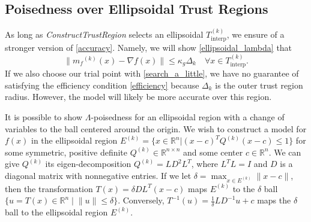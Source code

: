 \documentclass{article}
\theoremstyle{case}
\newcommand{\modelk}{{{m}_f}^{(k)}}
\newcommand{\sampletrk}{{T_{\text{interp}}^{(k)}}}
\newcommand{\ellipsek}{{E^{(k)}}}
\newcommand{\qk}{{Q^{(k)}}}
\begin{document}
\subsection{Poisedness over Ellipsoidal Trust Regions}

As long as \emph{ConstructTrustRegion} selects an ellipsoidal $ \sampletrk $, we ensure of a stronger version of \cref{accuracy}.
Namely, we will show \cref{ellipsoidal_lambda} that 
\[
    \|\modelk(x) - \nabla f(x) \| \le \kappa_g \Delta_{k} \quad \forall x \in \sampletrk.
\]
If we also choose our trial point with \cref{search_a_little}, we have no guarantee of satisfying the efficiency condition \cref{efficiency} because $\Delta_k$ is the outer trust region radius.
However, the model will likely be more accurate over this region.

It is possible to show $\Lambda$-poisedness for an ellipsoidal region with a change of variables to the ball centered around the origin.
We wish to construct a model for $f(x)$ in the ellipsoidal region
$\ellipsek = \{x \in \mathbb R^n | (x - c)^T\qk(x - c) \le 1\}$ for some symmetric, positive definite
$\qk \in \mathbb R^{n\times n}$ and some center $c \in \mathbb R^n$.
We can give $\qk$ its eigen-decomposition $\qk = L D^2 L^T$, where $L^TL = I$ and $D$ is a diagonal matrix with nonnegative entries.
If we let $\delta = \max_{x\in \ellipsek}\|x-c\|$, then the transformation $T(x) = \delta DL^T(x - c)$ maps $ \ellipsek $ to the $\delta$ ball $\{u = T(x) \in \mathbb R^n \; | \; \|u\| \le \delta\}$.
Conversely, $ T^{-1}(u) = \frac 1 {\delta} LD^{-1}u + c$ maps the $\delta$ ball to the ellipsoidal region $ \ellipsek $.

\end{document}
